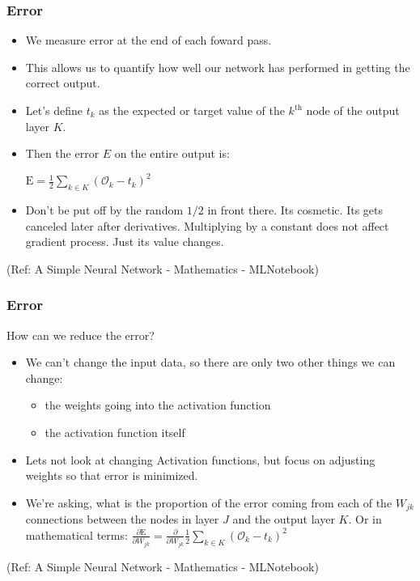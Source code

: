 \begin{frame}[fragile] \frametitle{Error}
\begin{itemize}
\item We measure error at the end of each foward pass. 
\item This allows us to quantify how well our network has performed in getting the correct output. 
\item Let’s define $t_k$ as the expected or target value of the $k^{\text{th}}$ node of the output layer $K$. 
\item Then the error $E$ on the entire output is:

$\text{E} = \frac{1}{2} \sum_{k \in K} \left( \mathcal{O}_{k} - t_{k} \right)^{2}$

\item Don't be put off by the random $1/2$ in front there. Its cosmetic. 
Its gets canceled later after derivatives. 
Multiplying by a constant does not affect gradient process. Just its value changes.
\end{itemize}

\tiny{(Ref: A Simple Neural Network - Mathematics - MLNotebook)}
\end{frame}

\begin{frame}[fragile] \frametitle{Error}
How can we reduce the error?
\begin{itemize}
\item We can’t change the input data, so there are only two other things we can change:
\begin{itemize}
\item the weights going into the activation function
\item the activation function itself
\end{itemize}
\item Lets not look at changing Activation functions, but focus on adjusting weights so that error is minimized.
\item We’re asking, what is the proportion of the error coming from each of the $W_{jk}$ connections 
between the nodes in layer $J$ and the output layer $K$. Or in mathematical terms:
$\frac{\partial{\text{E}}}{\partial{W_{jk}}} =  \frac{\partial{}}{\partial{W_{jk}}}  \frac{1}{2} \sum_{k \in K} \left( \mathcal{O}_{k} - t_{k} \right)^{2}$

\end{itemize}

\tiny{(Ref: A Simple Neural Network - Mathematics - MLNotebook)}
\end{frame}


